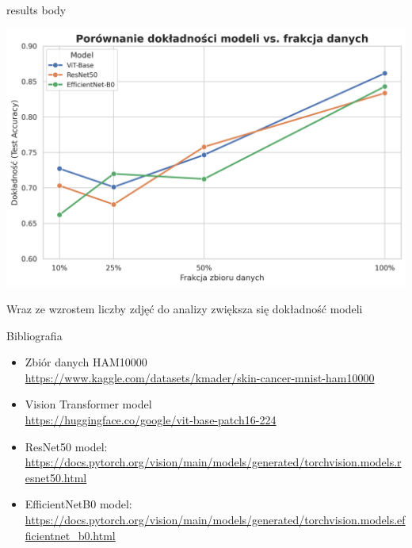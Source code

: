 \documentclass[final]{beamer}
\begin{document}
\begin{frame}[t]
\begin{columns}[T]
\begin{column}{.48\linewidth}
{\begin{beamercolorbox}[wd=\linewidth,dp=0.3cm]{results body}
                \begin{center}
                    \includegraphics[width=0.95\linewidth]{figures/accuracy_vs_fraction.png}
                \end{center}
                \vspace{0.1cm}
                Wraz ze wzrostem liczby zdjęć do analizy zwiększa się dokładność modeli
            \end{beamercolorbox}}
            \begin{block}{Bibliografia}
                \small
                \begin{itemize}
                    \item Zbiór danych HAM10000 \\
                    \url{https://www.kaggle.com/datasets/kmader/skin-cancer-mnist-ham10000}
                    \item Vision Transformer model \\
                    \url{https://huggingface.co/google/vit-base-patch16-224}
                    \item ResNet50 model:\\
                    \url{https://docs.pytorch.org/vision/main/models/generated/torchvision.models.resnet50.html}
                    \item EfficientNetB0 model:\\
                    \url{https://docs.pytorch.org/vision/main/models/generated/torchvision.models.efficientnet_b0.html}
                \end{itemize}
            \end{block}
        \end{column}


\end{columns}
\end{frame}
\end{document}
